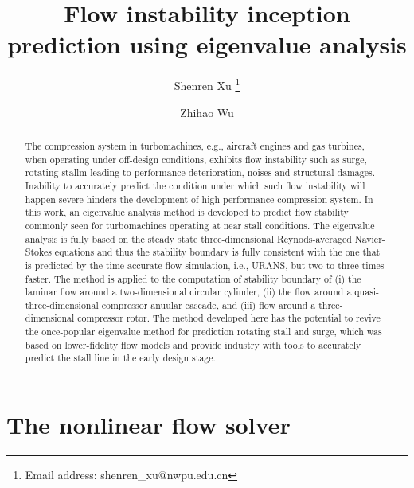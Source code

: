 \documentclass[journal,final]{new-aiaa}
\title{Flow instability inception prediction using eigenvalue analysis}
\author[1]{Shenren Xu	
\footnote{ Email address: shenren\_xu@nwpu.edu.cn}}
\affil[1]{School of Power and Energy, 
	Northwestern Polytechnical University, Xi'an, 710072, China}
\author[1]{Zhihao Wu
}
\begin{document}
\maketitle

\begin{abstract}
The compression system in turbomachines, e.g.,  aircraft engines and gas turbines,
when operating under off-design conditions, exhibits flow instability such as surge, rotating stallm leading to performance deterioration, noises and structural damages.
Inability to accurately predict the condition under which such flow instability will
happen severe hinders the development of high performance compression system.
In this work,  an eigenvalue analysis method is developed to predict flow stability
commonly seen for turbomachines operating at near stall conditions. The eigenvalue
analysis is fully based on the steady state three-dimensional Reynods-averaged
Navier-Stokes equations and thus the stability boundary is fully consistent with
the one that is predicted by the time-accurate flow simulation, i.e., URANS, but
two to three times faster.
The method is applied to the computation of stability boundary of
(i) the laminar flow around a two-dimensional circular cylinder,
(ii) the flow around a quasi-three-dimensional compressor anuular cascade, 
and 
(iii) flow around a three-dimensional compressor rotor.
The method developed here has the potential to revive
the once-popular eigenvalue method for prediction rotating stall and surge, which
was based on lower-fidelity flow models and provide industry with tools to
accurately predict the stall line in the early design stage.
\end{abstract}

%

\section{The nonlinear flow solver}
\end{document}
